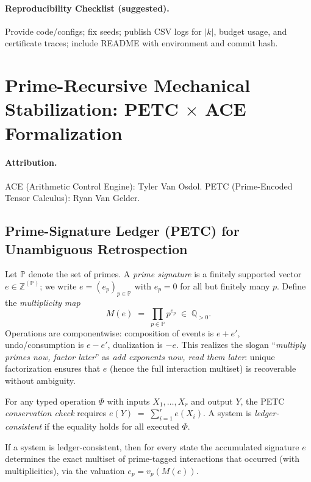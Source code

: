 \documentclass[11pt]{article}
\theoremstyle{definition}
\theoremstyle{remark}
\newcommand{\1}{\mathbf{1}}
\begin{document}
\paragraph{Reproducibility Checklist (suggested).} Provide code/configs; fix seeds; publish CSV logs for $|k|$, budget usage, and certificate traces; include README with environment and commit hash.

\section{Prime-Recursive Mechanical Stabilization: PETC \texorpdfstring{$\times$}{x} ACE Formalization}
\label{sec:pirtm_formal}

\paragraph{Attribution.}
\textsc{ACE} (Arithmetic Control Engine): Tyler Van Osdol. \;
\textsc{PETC} (Prime-Encoded Tensor Calculus): Ryan Van Gelder.

\subsection{Prime-Signature Ledger (PETC) for Unambiguous Retrospection}
Let $\mathbb{P}$ denote the set of primes. A \emph{prime signature} is a finitely supported vector
$e \in \mathbb{Z}^{(\mathbb{P})}$; we write $e=(e_p)_{p \in \mathbb{P}}$ with $e_p=0$ for all but finitely many $p$.
Define the \emph{multiplicity map}
\[
  M(e) \;=\; \prod_{p\in\mathbb{P}} p^{e_p} \;\in\; \mathbb{Q}_{>0}.
\]
Operations are componentwise: composition of events is $e+e'$, undo/consumption is $e-e'$, dualization is $-e$.
This realizes the slogan ``\emph{multiply primes now, factor later}'' as \emph{add exponents now, read them later}:
unique factorization ensures that $e$ (hence the full interaction multiset) is recoverable without ambiguity.

\begin{definition}
For any typed operation $\Phi$ with inputs $X_1,\dots,X_r$ and output $Y$, the PETC \emph{conservation check} requires
\(
  e(Y) \;=\; \sum_{i=1}^r e(X_i).
\)
A system is \emph{ledger-consistent} if the equality holds for all executed $\Phi$.
\end{definition}

\begin{proposition}
If a system is ledger-consistent, then for every state the accumulated signature $e$ determines the exact
multiset of prime-tagged interactions that occurred (with multiplicities), via the valuation $e_p = v_p(M(e))$.
\end{proposition}
\end{document}
